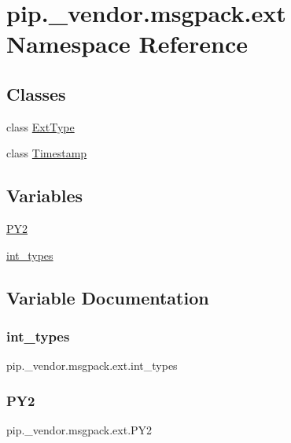 \hypertarget{namespacepip_1_1__vendor_1_1msgpack_1_1ext}{}\section{pip.\+\_\+vendor.\+msgpack.\+ext Namespace Reference}
\label{namespacepip_1_1__vendor_1_1msgpack_1_1ext}
\subsection*{Classes}
\begin{DoxyCompactItemize}
\item 
class \hyperlink{classpip_1_1__vendor_1_1msgpack_1_1ext_1_1ExtType}{Ext\+Type}
\item 
class \hyperlink{classpip_1_1__vendor_1_1msgpack_1_1ext_1_1Timestamp}{Timestamp}
\end{DoxyCompactItemize}
\subsection*{Variables}
\begin{DoxyCompactItemize}
\item 
\hyperlink{namespacepip_1_1__vendor_1_1msgpack_1_1ext_a66424b88703fd30675e083d02b69b396}{P\+Y2}
\item 
\hyperlink{namespacepip_1_1__vendor_1_1msgpack_1_1ext_abc2e17731a326a9e56167f584c65d704}{int\+\_\+types}
\end{DoxyCompactItemize}


\subsection{Variable Documentation}
\mbox{\label{namespacepip_1_1__vendor_1_1msgpack_1_1ext_abc2e17731a326a9e56167f584c65d704}} 
\subsubsection{\texorpdfstring{int\+\_\+types}{int\_types}}
{\footnotesize\ttfamily pip.\+\_\+vendor.\+msgpack.\+ext.\+int\+\_\+types}

\mbox{\label{namespacepip_1_1__vendor_1_1msgpack_1_1ext_a66424b88703fd30675e083d02b69b396}} 
\subsubsection{\texorpdfstring{P\+Y2}{PY2}}
{\footnotesize\ttfamily pip.\+\_\+vendor.\+msgpack.\+ext.\+P\+Y2}

